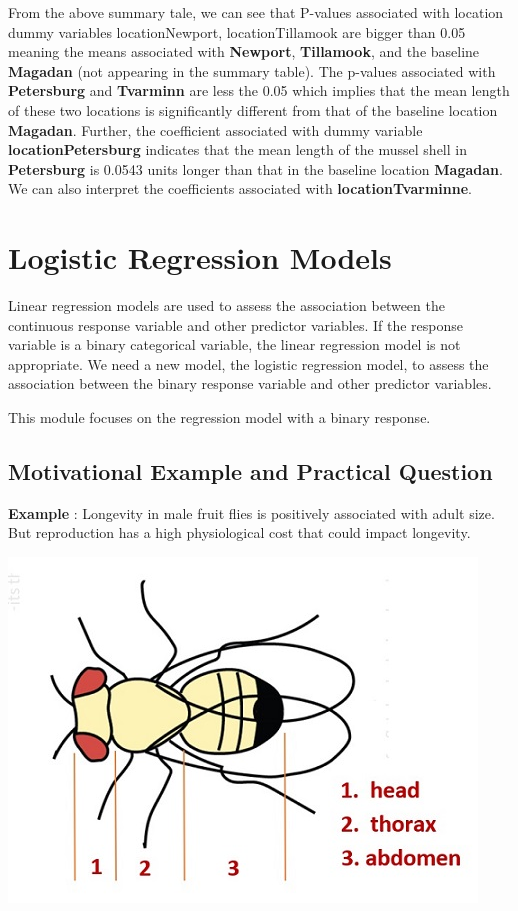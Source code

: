 \documentclass[
]{book}
\begin{document}
From the above summary tale, we can see that P-values associated with location dummy variables locationNewport, locationTillamook are bigger than 0.05 meaning the means associated with \textbf{Newport}, \textbf{Tillamook}, and the baseline \textbf{Magadan} (not appearing in the summary table). The p-values associated with \textbf{Petersburg} and \textbf{Tvarminn} are less the 0.05 which implies that the mean length of these two locations is significantly different from that of the baseline location \textbf{Magadan}. Further, the coefficient associated with dummy variable \textbf{locationPetersburg} indicates that the mean length of the mussel shell in \textbf{Petersburg} is 0.0543 units longer than that in the baseline location \textbf{Magadan}. We can also interpret the coefficients associated with \textbf{locationTvarminne}.

\hfill\break

\hypertarget{logistic-regression-models}{%
\chapter{Logistic Regression Models}\label{logistic-regression-models}}

Linear regression models are used to assess the association between the continuous response variable and other predictor variables. If the response variable is a binary categorical variable, the linear regression model is not appropriate. We need a new model, the logistic regression model, to assess the association between the binary response variable and other predictor variables.

This module focuses on the regression model with a binary response.

\hypertarget{motivational-example-and-practical-question}{%
\section{Motivational Example and Practical Question}\label{motivational-example-and-practical-question}}

\textbf{Example }: Longevity in male fruit flies is positively associated with adult size. But reproduction has a high physiological cost that could impact longevity.

\begin{center}\includegraphics[width=0.8\linewidth]{img04/w04-FruitFliesImage} \end{center}
\end{document}
